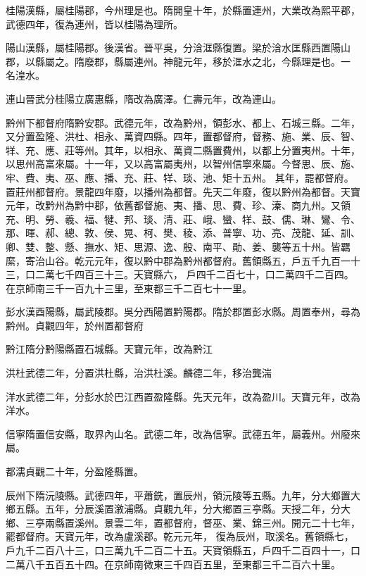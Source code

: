 \begin{pinyinscope}
 桂陽漢縣，屬桂陽郡，今州理是也。隋開皇十年，於縣置連州，大業改為熙平郡，武德四年，復為連州，皆以桂陽為理所。



 陽山漢縣，屬桂陽郡。後漢省。晉平吳，分浛洭縣復置。梁於浛水匡縣西置陽山郡，以縣屬之。隋廢郡，縣屬連州。神龍元年，移於洭水之北，今縣理是也。一
 名湟水。



 連山晉武分桂陽立廣惠縣，隋改為廣澤。仁壽元年，改為連山。



 黔州下都督府隋黔安郡。武德元年，改為黔州，領彭水、都上、石城三縣。二年，又分置盈隆、洪杜、相永、萬資四縣。四年，置都督府，督務、施、業、辰、智、䍧、充、應、莊等州。其年，以相永、萬資二縣置費州，以都上分置夷州。十年，以思州高富來屬。十一年，又以高富屬夷州，以智州信寧來屬。今督思、辰、施、牢、費、夷、巫、應、播、充、莊、䍧、琰、池、矩十五州。
 其年，罷都督府。置莊州都督府。景龍四年廢，以播州為都督。先天二年廢，復以黔州為都督。天寶元年，改黔州為黔中郡，依舊都督施、夷、播、思、費、珍、溱、商九州。又領充、明、勞、羲、福、犍、邦、琰、清、莊、峨、蠻、䍧、鼓、儒、琳、鸞、令、那、暉、郝、總、敦、侯、晃、柯、樊、稜、添、普寧、功、亮、茂龍、延、訓、卿、雙、整、懸、撫水、矩、思源、逸、殷、南平、勛、姜、襲等五十州。皆羈縻，寄治山谷。乾元元年，復以黔中郡為黔州都督府。舊領縣五，戶五千九百一十三，口二萬七千四百三十三。天寶縣六，
 戶四千二百七十，口二萬四千二百四。在京師南三千一百九十三里，至東都三千二百七十一里。



 彭水漢酉陽縣，屬武陵郡。吳分西陽置黔陽郡。隋於郡置彭水縣。周置奉州，尋為黔州。貞觀四年，於州置都督府



 黔江隋分黔陽縣置石城縣。天寶元年，改為黔江



 洪杜武德二年，分置洪杜縣，治洪杜溪。麟德二年，移治龔湍



 洋水武德二年，分彭水於巴江西置盈隆縣。先天元年，改為盈川。天寶元年，改為洋水。



 信寧隋置信安縣，取界內山名。武德二年，改為信寧。武德五年，屬義州。州廢來屬。



 都濡貞觀二十年，分盈隆縣置。



 辰州下隋沅陵縣。武德四年，平蕭銑，置辰州，領沅陵等五縣。九年，分大鄉置大鄉五縣。五年，分辰溪置漵浦縣。貞觀九年，分大鄉置三亭縣。天授二年，分大鄉、三亭兩縣置溪州。景雲二年，置都督府，督巫、業、錦三州。開元二十七年，罷都督府。天寶元年，改為盧溪郡。乾元元年，
 復為辰州，取溪名。舊領縣七，戶九千二百八十三，口三萬九千二百二十五。天寶領縣五，戶四千二百四十一，口二萬八千五百五十四。在京師南微東三千四百五里，至東都三千二百六十里。




\end{pinyinscope}

